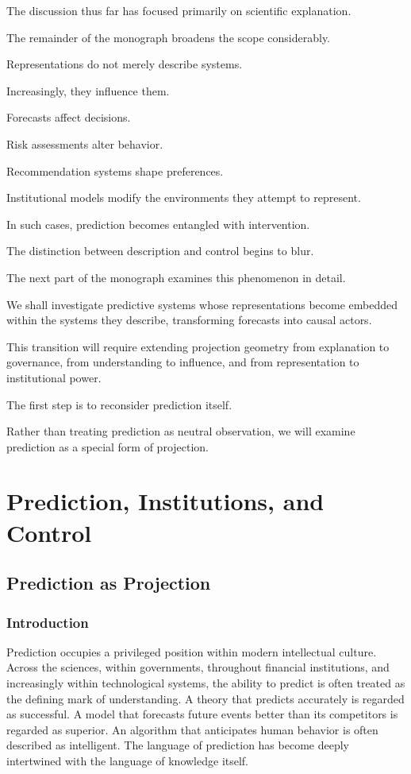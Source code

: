 \documentclass[11pt,oneside,openany]{book}
\begin{document}
The discussion thus far has focused primarily on scientific explanation.

The remainder of the monograph broadens the scope considerably.

Representations do not merely describe systems.

Increasingly, they influence them.

Forecasts affect decisions.

Risk assessments alter behavior.

Recommendation systems shape preferences.

Institutional models modify the environments they attempt to represent.

In such cases, prediction becomes entangled with intervention.

The distinction between description and control begins to blur.

The next part of the monograph examines this phenomenon in detail.

We shall investigate predictive systems whose representations become embedded within the systems they describe, transforming forecasts into causal actors.

This transition will require extending projection geometry from explanation to governance, from understanding to influence, and from representation to institutional power.

The first step is to reconsider prediction itself.

Rather than treating prediction as neutral observation, we will examine prediction as a special form of projection.

\part{Prediction, Institutions, and Control}

\chapter{Prediction as Projection}

\section{Introduction}

Prediction occupies a privileged position within modern intellectual culture. Across the sciences, within governments, throughout financial institutions, and increasingly within technological systems, the ability to predict is often treated as the defining mark of understanding. A theory that predicts accurately is regarded as successful. A model that forecasts future events better than its competitors is regarded as superior. An algorithm that anticipates human behavior is often described as intelligent. The language of prediction has become deeply intertwined with the language of knowledge itself.
\end{document}
